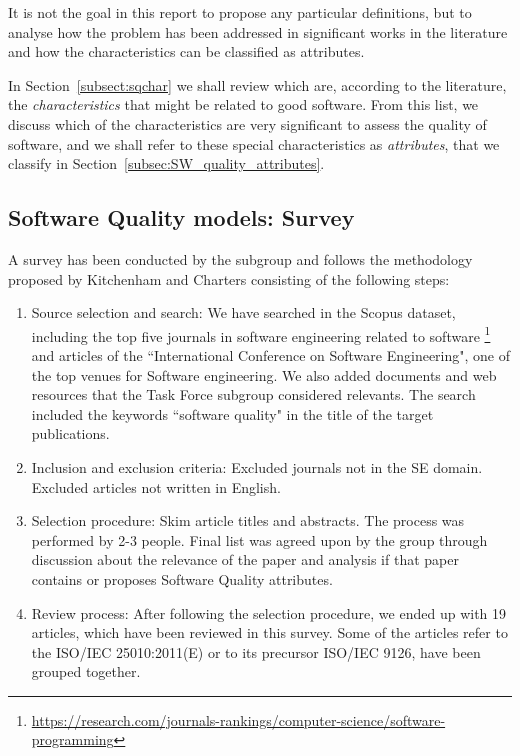It is not the goal in this report to propose any particular definitions, but to analyse how the problem has been addressed in significant works in the literature and how the characteristics can be classified as attributes.

In Section~\ref{subsect:sqchar} we shall review which are, according to the literature, the \textit{characteristics} that might be related to good software. From this list, we discuss which of the characteristics are very significant to assess the quality of software, and we shall refer to these special characteristics as \textit{attributes}, that we classify in Section~\ref{subsec:SW_quality_attributes}.

\subsection{Software Quality models: Survey}

A survey has been conducted by the subgroup and follows the methodology proposed by Kitchenham and Charters \cite{keele2007guidelines} consisting of the following steps:

\begin{enumerate}
    \item Source selection and search: We have searched in the Scopus dataset, including the top five journals in software engineering related to software \footnote{\url{https://research.com/journals-rankings/computer-science/software-programming}} and articles of the  ``International Conference on Software Engineering", one of the top venues for Software engineering. We also added documents and web resources that the Task Force subgroup considered relevants. The search included the keywords ``software quality" in the title of the target publications.
    \item Inclusion and exclusion criteria: Excluded journals not in the SE domain. Excluded articles not written in English.
    \item Selection procedure: Skim article titles and abstracts. The process was performed by 2-3 people. Final list was agreed upon by the group through discussion about the relevance of the paper and analysis if that paper contains or proposes Software Quality attributes.
    \item Review process: After following the selection procedure, we ended up with 19 articles, which have been reviewed in this survey. Some of the articles refer to the ISO/IEC 25010:2011(E)\cite{iso_25010_2011_2017} or to its precursor ISO/IEC 9126, have been grouped together.
\end{enumerate}

